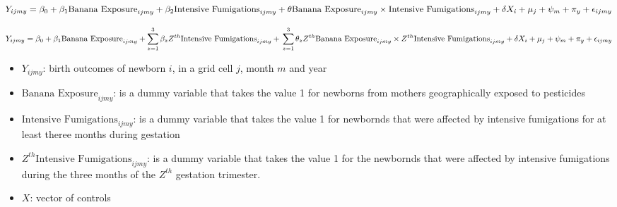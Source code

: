 \documentclass[hyperref={pdfpagelabels=false}]{beamer}
\begin{document}
   \begin{frame}{}
       \begin{equation}
           Y_{ijmy} = \beta_{0} + \beta_{1}\text{Banana Exposure}_{ijmy} + \beta_{2}\text{Intensive Fumigations}_{ijmy} + \\ \theta \text{Banana Exposure}_{ijmy} \times \text{Intensive Fumigations}_{ijmy} + \\ \vspace{2mm} \delta X_{i} + \mu_{j} + \psi_{m} + \pi_{y} + \epsilon_{ijmy} 
       \end{equation}
       
       \vspace{4mm}


\hline


 \begin{equation}
           Y_{ijmy} = \beta_{0} + \beta_{1}\text{Banana Exposure}_{ijmy} + \sum_{z=1}^{3} \beta_{z} Z^{th}\text{Intensive Fumigations}_{ijmy} + \\  \sum_{z=1}^{3} \theta_{z} Z^{th}\text{Banana Exposure}_{ijmy} \times   Z^{th}\text{Intensive Fumigations}_{ijmy} + \\  \vspace{2mm} \delta X_{i} + \mu_{j} + \psi_{m} + \pi_{y} + \epsilon_{ijmy} 
       \end{equation}

       
   \end{frame}



        \begin{frame}{}

        \begin{itemize}
        \justifying
            \item $Y_{ijmy}$: birth outcomes of newborn $i$, in a grid cell $j$, month $m$ and year 
            \vspace{2mm}
            \item $\text{Banana Exposure}_{ijmy}$: is a dummy variable that takes the value 1 for newborns from mothers geographically exposed to pesticides
            \vspace{2mm}
            \item $\text{Intensive Fumigations}_{ijmy}$: is a dummy variable that takes the value 1 for newbornds that were affected by intensive fumigations for at least theree months during gestation
            \vspace{2mm}
            \item $Z^{th}\text{Intensive Fumigations}_{ijmy}$: is a dummy variable that takes the value 1 for the newbornds that were affected by intensive fumigations during the three months of the $Z^{th}$ gestation trimester.
            \vspace{2mm}
            \item $X$: vector of controls
        \end{itemize}
            
        \end{frame}
        
\end{document}
